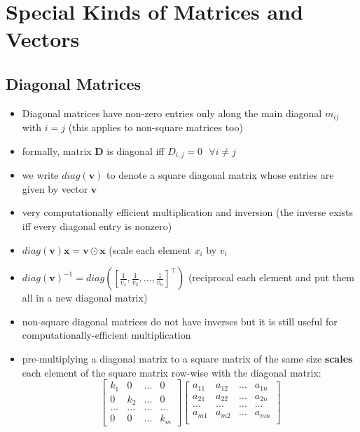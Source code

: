 \documentclass[11pt,twocolumn]{report}
\begin{document}
\section{Special Kinds of Matrices and Vectors}
\subsection{Diagonal Matrices}
\begin{itemize}
  \item Diagonal matrices have non-zero entries only along the main
    diagonal $m_{ij}$ with $i = j$ (this applies to non-square matrices too)
  \item formally, matrix $\bm{D}$ is diagonal iff $D_{i, j} = 0 \text{  }
    \forall i \neq j$
  \item we write $diag(\bm{v})$ to denote a square diagonal matrix whose
    entries are given by vector $\bm{v}$
  \item very computationally efficient multiplication and inversion (the
    inverse exists iff every diagonal entry is nonzero)
  \item $diag(\bm{v})\bm{x} = \bm{v} \odot \bm{x}$ (scale each element $x_i$ by
    $v_i$
  \item $diag(\bm{v})^{-1} =
    diag([\frac{1}{v_1},\frac{1}{v_2},...,\frac{1}{v_n}]^\intercal)$
    (reciprocal each element and put them all in a new diagonal matrix)
  \item non-square diagonal matrices do not have inverses but it is still useful for
    computationally-efficient multiplication
  \item pre-multiplying a diagonal matrix to a square matrix of the same size
    \textbf{scales} each element of the square matrix row-wise with the
    diagonal matrix:
      \begin{equation*}
        \begin{bmatrix}
          k_1 & 0 & \hdots & 0\\
          0 & k_2 & \hdots & 0\\
          \hdots & \hdots & \hdots & \hdots\\
          0 & 0 & \hdots & k_m
        \end{bmatrix}
        \begin{bmatrix}
          a_{11} & a_{12} & \hdots & a_{1n}\\
          a_{21} & a_{22} & \hdots & a_{2n}\\
          \hdots & \hdots & \hdots & \hdots\\
          a_{m1} & a_{m2} & \hdots & a_{mn}\\

\end{bmatrix}
\end{equation*}
\end{itemize}
\end{document}
